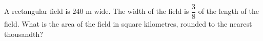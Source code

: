 A rectangular field is $240$ m wide. The width of the field is $\dfrac{3}{8}$ of the length of the field. What is the area of the field in square kilometres, rounded to the nearest thousandth?
